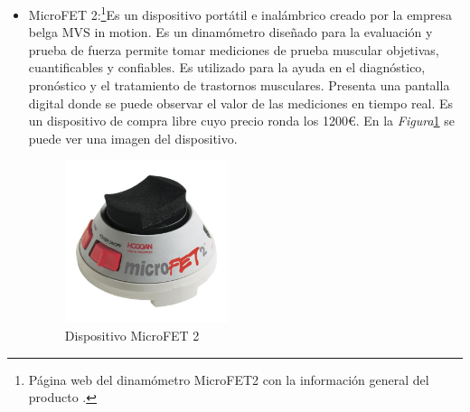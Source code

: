 \begin{itemize}
    \item MicroFET 2:\cite{microfet}\footnote{Página web del dinamómetro MicroFET2 con la información general del producto \cite{microfet}.}Es un dispositivo portátil e inalámbrico creado por la empresa belga MVS in motion. Es un dinamómetro diseñado para la evaluación y prueba de fuerza permite tomar mediciones de prueba muscular objetivas, cuantificables y confiables.
    Es utilizado para la ayuda en el diagnóstico, pronóstico y el tratamiento de trastornos musculares. Presenta una pantalla digital donde se puede observar el valor de las mediciones en tiempo real. 
    Es un dispositivo de compra libre cuyo precio ronda los 1200€. En la \textit{Figura}\ref{fig:MicroFET 2} se puede ver una imagen del dispositivo.
    \begin{figure}[h]
        \centering
        \includegraphics[width=0.45\textwidth]{img/MicroFET 2.jpg}
        \caption{Dispositivo MicroFET 2}
        \label{fig:MicroFET 2}
    \end{figure}
    

\end{itemize}

